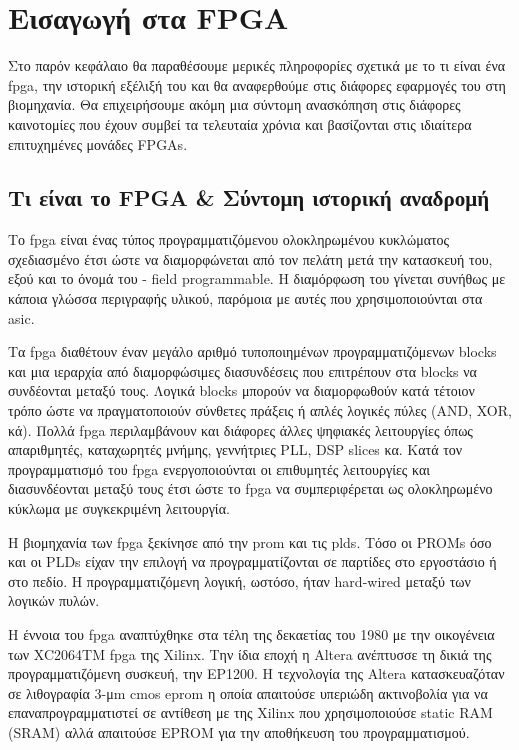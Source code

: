 \section{Εισαγωγή στα FPGA}

Στο παρόν κεφάλαιο θα παραθέσουμε μερικές πληροφορίες σχετικά με το τι είναι ένα \gls{fpga}, την ιστορική εξέλιξή του και θα αναφερθούμε στις διάφορες εφαρμογές του στη βιομηχανία. Θα επιχειρήσουμε ακόμη μια σύντομη ανασκόπηση στις διάφορες καινοτομίες που έχουν συμβεί τα τελευταία χρόνια και βασίζονται στις ιδιαίτερα επιτυχημένες μονάδες FPGAs.

\subsection{Τι είναι το FPGA \& Σύντομη ιστορική αναδρομή}

Το \gls{fpga} είναι ένας τύπος προγραμματιζόμενου ολοκληρωμένου κυκλώματος σχεδιασμένο έτσι ώστε να διαμορφώνεται από τον πελάτη μετά την κατασκευή του, εξού και το όνομά του - field programmable. Η διαμόρφωση του γίνεται συνήθως με κάποια γλώσσα περιγραφής υλικού, παρόμοια με αυτές που χρησιμοποιούνται στα \gls{asic}.

Τα \gls{fpga} διαθέτουν έναν μεγάλο αριθμό τυποποιημένων προγραμματιζόμενων blocks και μια ιεραρχία από διαμορφώσιμες διασυνδέσεις που επιτρέπουν στα blocks να συνδέονται μεταξύ τους. Λογικά blocks μπορούν να διαμορφωθούν κατά τέτοιον τρόπο ώστε να πραγματοποιούν σύνθετες πράξεις ή απλές λογικές πύλες (AND, XOR, κά). Πολλά \gls{fpga} περιλαμβάνουν και διάφορες άλλες ψηφιακές λειτουργίες όπως απαριθμητές, καταχωρητές μνήμης, γεννήτριες PLL, DSP slices κα. Κατά τον προγραμματισμό του \gls{fpga} ενεργοποιούνται οι επιθυμητές λειτουργίες και διασυνδέονται μεταξύ τους έτσι ώστε το \gls{fpga} να συμπεριφέρεται ως ολοκληρωμένο κύκλωμα με συγκεκριμένη λειτουργία.

Η βιομηχανία των \gls{fpga} ξεκίνησε από την \gls{prom} και τις \glspl{pld}. Τόσο οι PROMs όσο και οι PLDs είχαν την επιλογή να προγραμματίζονται σε παρτίδες στο εργοστάσιο ή στο πεδίο. Η προγραμματιζόμενη λογική, ωστόσο, ήταν hard-wired μεταξύ των λογικών πυλών.

Η έννοια του \gls{fpga} αναπτύχθηκε στα τέλη της δεκαετίας του 1980 με την οικογένεια των XC2064TM \gls{fpga} της Xilinx. Την ίδια εποχή η Altera ανέπτυσσε τη δικιά της προγραμματιζόμενη συσκευή, την EP1200. Η τεχνολογία της Altera κατασκευαζόταν σε λιθογραφία 3-μm \gls{cmos} \gls{eprom} η οποία απαιτούσε υπεριώδη ακτινοβολία για να επαναπρογραμματιστεί σε αντίθεση με της Xilinx που χρησιμοποιούσε static RAM (SRAM) αλλά απαιτούσε EPROM για την αποθήκευση του προγραμματισμού.

